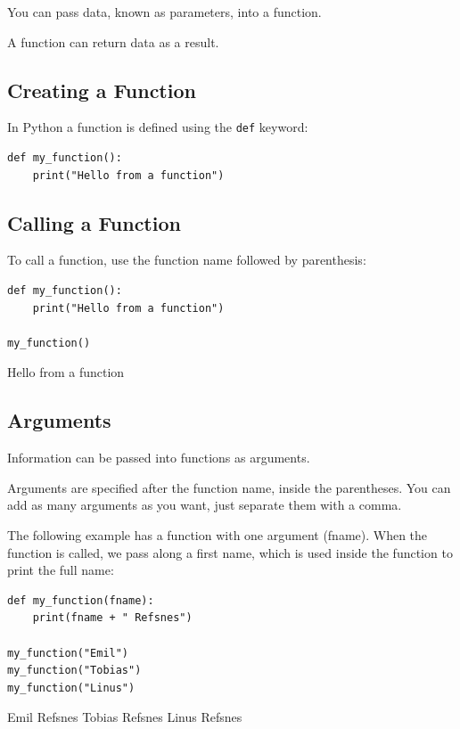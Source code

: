 \documentclass[12pt,a4paper]{article}
\newcommand{\code}[1]{%
	\colorbox{backcolour}{\lstinline{#1}}%
}
\begin{document}
You can pass data, known as parameters, into a function.

A function can return data as a result.

\subsection{Creating a Function}

In Python a function is defined using the \code{def} keyword:

\begin{ebox}
	\begin{lstlisting}
def my_function():
    print("Hello from a function")
	\end{lstlisting}
\end{ebox}
\subsection{Calling a Function}

To call a function, use the function name followed by parenthesis:

\begin{ebox}
	\begin{lstlisting}
def my_function():
    print("Hello from a function")

my_function()
	\end{lstlisting}
\tcblower
	\begin{vercode}
Hello from a function
	\end{vercode}
\end{ebox}
\subsection{Arguments}

Information can be passed into functions as arguments.

Arguments are specified after the function name, inside the parentheses. You
can add as many arguments as you want, just separate them with a comma.

The following example has a function with one argument (fname). When the
function is called, we pass along a first name, which is used inside the
function to print the full name:

\begin{ebox}
	\begin{lstlisting}
def my_function(fname):
    print(fname + " Refsnes")

my_function("Emil")
my_function("Tobias")
my_function("Linus")
	\end{lstlisting}
\tcblower
	\begin{vercode}
Emil Refsnes
Tobias Refsnes
Linus Refsnes
	\end{vercode}
\end{ebox}
\end{document}
